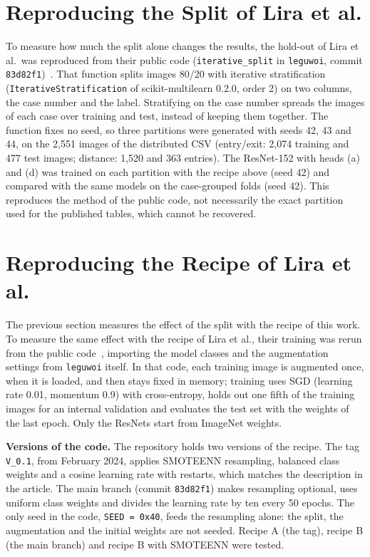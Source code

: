 \section{Reproducing the Split of Lira et al.}
\label{sec:leak_setup}

To measure how much the split alone changes the results, the hold-out of Lira et al.\ was reproduced from their public code (\texttt{iterative\_split} in \texttt{leguwoi}, commit \texttt{83d82f1})~\cite{leguwoi}. That function splits images 80/20 with iterative stratification~\cite{sechidis2011stratification} (\texttt{IterativeStratification} of scikit-multilearn 0.2.0, order 2) on two columns, the case number and the label. Stratifying on the case number spreads the images of each case over training and test, instead of keeping them together. The function fixes no seed, so three partitions were generated with seeds 42, 43 and 44, on the 2,551 images of the distributed CSV (entry/exit: 2,074 training and 477 test images; distance: 1,520 and 363 entries). The ResNet-152 with heads (a) and (d) was trained on each partition with the recipe above (seed 42) and compared with the same models on the case-grouped folds (seed 42). This reproduces the method of the public code, not necessarily the exact partition used for the published tables, which cannot be recovered.

\section{Reproducing the Recipe of Lira et al.}
\label{sec:repro_setup}

The previous section measures the effect of the split with the recipe of this work. To measure the same effect with the recipe of Lira et al., their training was rerun from the public code~\cite{leguwoi}, importing the model classes and the augmentation settings from \texttt{leguwoi} itself. In that code, each training image is augmented once, when it is loaded, and then stays fixed in memory; training uses SGD (learning rate 0.01, momentum 0.9) with cross-entropy, holds out one fifth of the training images for an internal validation and evaluates the test set with the weights of the last epoch. Only the ResNets start from ImageNet weights.

\textbf{Versions of the code.} The repository holds two versions of the recipe. The tag \texttt{V\_0.1}, from February 2024, applies SMOTEENN resampling, balanced class weights and a cosine learning rate with restarts, which matches the description in the article. The main branch (commit \texttt{83d82f1}) makes resampling optional, uses uniform class weights and divides the learning rate by ten every 50 epochs. The only seed in the code, \texttt{SEED = 0x40}, feeds the resampling alone: the split, the augmentation and the initial weights are not seeded. Recipe A (the tag), recipe B (the main branch) and recipe B with SMOTEENN were tested.

